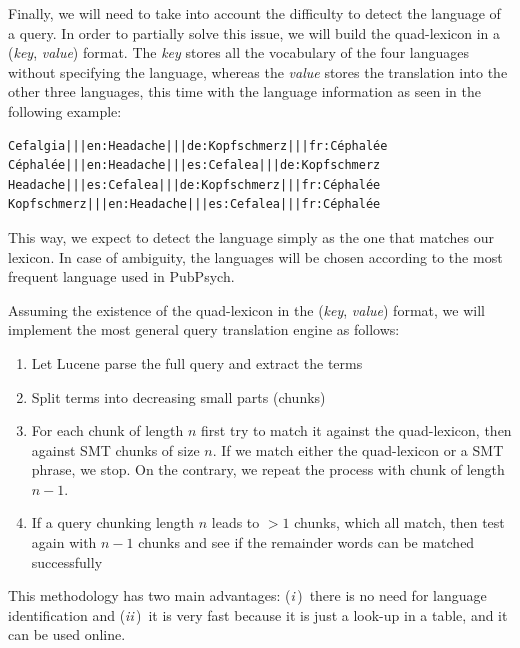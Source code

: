 \documentclass[a4paper,11pt]{article}
\newcommand{\Ni}{({\em i\,})~}
\newcommand{\Nii}{({\em ii\,})~}
\begin{document}
Finally, we will need to take into account the difficulty to detect the language of a query. In order to partially solve this issue, we will build the quad-lexicon in a (\emph{key}, \emph{value}) format. The \emph{key} stores all the vocabulary of the four languages without specifying the language, whereas the \emph{value} stores the translation into the other three languages, this time with the language information as seen in the following example:
{\small
\begin{verbatim}
Cefalgia|||en:Headache|||de:Kopfschmerz|||fr:Céphalée
Céphalée|||en:Headache|||es:Cefalea|||de:Kopfschmerz
Headache|||es:Cefalea|||de:Kopfschmerz|||fr:Céphalée
Kopfschmerz|||en:Headache|||es:Cefalea|||fr:Céphalée 
\end{verbatim}
}

\noindent This way, we expect to detect the language simply as the one that matches our lexicon. In case of ambiguity, the languages will be chosen according to the most frequent language used in PubPsych.

Assuming the existence of the quad-lexicon in the (\emph{key}, \emph{value}) format, we will implement the most general query translation engine as follows:

\begin{enumerate}
 \item Let Lucene parse the full query and extract the terms
 \item Split terms into decreasing small parts (chunks)
 \item For each chunk of length $n$ first try to match it against the quad-lexicon, then against SMT chunks of size $n$. If we match either the quad-lexicon or a SMT phrase, we stop. On the contrary, we repeat the process with chunk of length $n-1$.
 \item If a query chunking length $n$ leads to $>1$ chunks, which all match, then test again with $n-1$ chunks and see if the remainder words can be matched successfully
\end{enumerate}

This methodology has two main advantages: \Ni there is no need for language identification and \Nii it is very fast because it is just a look-up in a table, and it can be used online.


% 
% 
\end{document}
